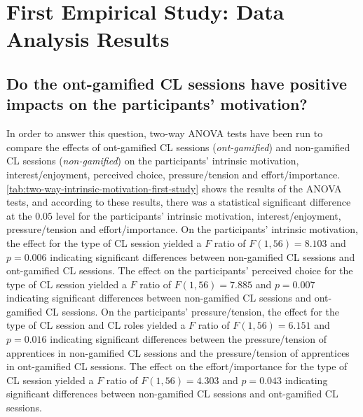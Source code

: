 \section{First Empirical Study: Data Analysis Results}
\label{sec:first-study}

\subsection*{Do the ont-gamified CL sessions have positive impacts on the participants' motivation?}

In order to answer this question, two-way ANOVA tests have been run to compare the effects of ont-gamified CL sessions (\emph{ont-gamified}) and non-gamified CL sessions (\emph{non-gamified}) on the participants' intrinsic motivation, interest/enjoyment, perceived choice, pressure/tension and effort/importance.
\autoref{tab:two-way-intrinsic-motivation-first-study} shows the results of the ANOVA tests, and 
according to these results, there was a statistical significant difference at the $0.05$ level for the participants' intrinsic motivation, interest/enjoyment, pressure/tension and effort/importance.
On the participants' intrinsic motivation, the effect for the type of CL session yielded a $F$ ratio of $F(1,56) = 8.103$ and $p = 0.006$ indicating significant differences between non-gamified CL sessions and ont-gamified CL sessions.
The effect on the participants' perceived choice for the type of CL session yielded a $F$ ratio of $F(1,56) = 7.885$ and $p = 0.007$ indicating significant differences between non-gamified CL sessions and ont-gamified CL sessions.
On the participants' pressure/tension, the effect for the type of CL session and CL roles yielded a $F$ ratio of $F(1,56) = 6.151$ and $p = 0.016$ indicating significant differences between the pressure/tension of apprentices in non-gamified CL sessions and the pressure/tension of apprentices in ont-gamified CL sessions.
The effect on the effort/importance for the type of CL session yielded a $F$ ratio of $F(1,56) = 4.303$ and $p = 0.043$ indicating significant differences between non-gamified CL sessions and ont-gamified CL sessions.



